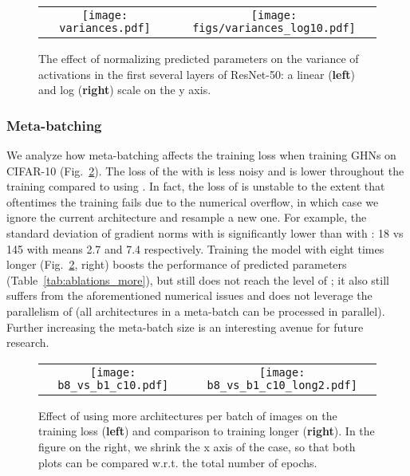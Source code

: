 \begin{figure}[tbhp]
	\vspace{-1pt}
	\centering
	\setlength{\tabcolsep}{10pt}
	\begin{tabular}{cc}
		\texttt{[image: variances.pdf]} & \texttt{[image: figs/variances\_log10.pdf]}
	\end{tabular}
	\vspace{-5pt}
	\caption{The effect of normalizing predicted parameters on the variance of activations in the first several layers of ResNet-50: a linear (\textbf{left}) and log (\textbf{right}) scale on the y axis. }
	\label{fig:activations}
	\vspace{-1pt}
\end{figure}

\subsubsection{Meta-batching\label{apdx:meta}}
We analyze how meta-batching affects the training loss when training GHNs on CIFAR-10 (Fig.~\ref{fig:meta_batch}). The loss of the \ghnours with  is less noisy and is lower throughout the training compared to using . In fact, the loss of  is unstable to the extent that oftentimes the training fails due to the numerical overflow, in which case we ignore the current architecture and resample a new one.
For example, the standard deviation of gradient norms with  is significantly lower than with : 18 vs 145 with means 2.7 and 7.4 respectively.
Training the model with  eight times longer (Fig.~\ref{fig:meta_batch}, right) boosts the performance of predicted parameters (Table~\ref{tab:ablations_more}), but still does not reach the level of ; it also still suffers from the aforementioned numerical issues and does not leverage the parallelism of  (all architectures in a meta-batch can be processed in parallel). 
Further increasing the meta-batch size is an interesting avenue for future research.

\begin{figure}[tbhp]
	\vspace{-1pt}
	\centering
	\setlength{\tabcolsep}{10pt}
	\begin{tabular}{cc}
		\texttt{[image: b8\_vs\_b1\_c10.pdf]} & \texttt{[image: b8\_vs\_b1\_c10\_long2.pdf]}\\
	\end{tabular}
	\vspace{-5pt}
	\caption{Effect of using more architectures per batch of images on the training loss (\textbf{left}) and comparison to training longer (\textbf{right}). In the figure on the right, we shrink the x axis of the  case, so that both plots can be compared w.r.t. the total number of epochs.   }
	\label{fig:meta_batch}
	\vspace{-1pt}
\end{figure}

